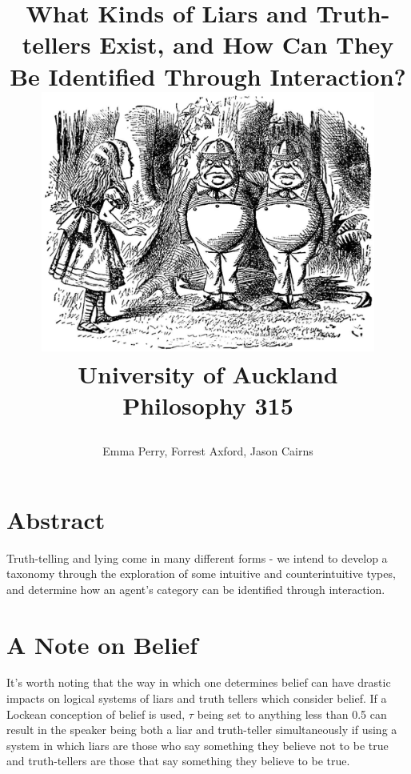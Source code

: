 \documentclass[12pt, titlepage, twoside]{report}
\title{
{What Kinds of Liars and Truth-tellers Exist, and How Can They Be Identified Through Interaction?} \newline \newline
{\includegraphics[width=11cm]{alice.eps}}\\
{\large University of Auckland}\\
{\large Philosophy 315}\\
\author{Emma Perry, Forrest Axford, Jason Cairns}}
\begin{document}
\maketitle
\tableofcontents
\newpage
\section*{Abstract}
Truth-telling and lying come in many different forms - we intend to develop a taxonomy through the exploration of some intuitive and counterintuitive types, and determine how an agent’s category can be identified through interaction.

\section*{A Note on Belief}
It’s worth noting that the way in which one determines belief can  have drastic impacts on logical systems of liars and truth tellers which consider belief.\autocite{sep-logic-action} If a Lockean conception of belief is used, $\tau$ being set to anything less than 0.5 can result in the speaker being both a liar and truth-teller simultaneously if using a system in which liars are those who say something they believe not to be true and truth-tellers are those that say something they believe to be true.\autocite{sep-logic-epistemic} 
\end{document}
